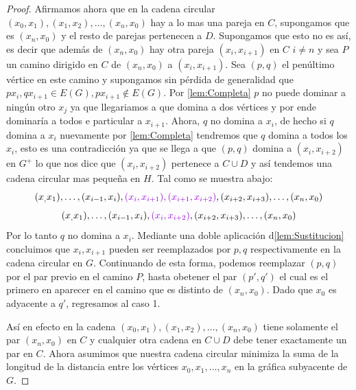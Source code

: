 \begin{proof}
Afirmamos ahora que en la cadena circular $(x_0,x_1),(x_1,x_2),\dots ,
(x_n,x_0)$ hay a lo mas una pareja en $C$, supongamos que es $(x_n,x_0)$ y el
resto de parejas pertenecen a $D$. Supongamos que esto no es así, es decir que
adem\'as de $(x_n,x_0)$ hay otra pareja $(x_i,x_{i+1})$ en $C$ $i\neq n$ y sea
$P$ un camino dirigido en $C$ de $(x_n,x_0)$ a $(x_i,x_{i+1})$. Sea $(p,q)$ el
penúltimo v\'ertice en este camino y supongamos sin p\'erdida de generalidad que
$px_i,qx_{i+1}\in E(G), px_{i+1}\notin E(G)$. Por \cref{lem:Completa} $p$ no
puede dominar a ningún otro $x_j$ ya que llegariamos a que domina a dos
v\'ertices y por ende dominaría a todos e particular a $x_{i+1}$. Ahora, $q$ no
domina a $x_i$, de hecho si $q$ domina a $x_i$ nuevamente por
\cref{lem:Completa} tendremos que $q$ domina a todos los $x_i$, esto es una
contradicci\'on ya que se llega a que $(p,q)$ domina a $(x_i,x_{i+2})$ en $G^+$
lo que nos dice que $(x_i,x_{i+2})$ pertenece a $C\cup D$ y así tendemos una
cadena circular mas pequeña en $H$. Tal como se muestra abajo:
$$ (x_,x_1), \dots , (x_{i-1},x_i ), {\color{malva} (x_i,x_{i+1}),
(x_{i+1},x_{i+2})},(x_{i+2},x_{i+3}), \dots , (x_n,x_0) $$
$$ (x_,x_1), \dots , (x_{i-1},x_i ), {\color{malva}
(x_i,x_{i+2})},(x_{i+2},x_{i+3}), \dots , (x_n,x_0) $$ Por lo tanto $q$ no
domina a $x_i$. Mediante una doble aplicaci\'on d\cref{lem:Sustitucion}
concluimos que $x_i,x_{i+1}$ pueden ser reemplazados por $p,q$ respectivamente
en la cadena circular en $G$. Continuando de esta forma, podemos reemplazar
$(p,q)$ por el par previo en el camino $P$, hasta obetener el par $(p',q')$ el
cual es el primero en aparecer en el camino que es distinto de $(x_n,x_0)$. Dado
que $x_0$ es adyacente a $q'$, regresamos al caso 1.

Así en efecto en la cadena $(x_0,x_1),(x_1,x_2),\dots,(x_n,x_0)$ tiene solamente
el par $(x_n,x_0)$ en $C$ y cualquier otra cadena en $C\cup D$ debe tener
exactamente un par en $C$. Ahora asumimos que nuestra cadena circular minimiza
la suma de la longitud de la distancia entre los vértices $x_0,x_1,\dots ,x_n$
en la gráfica subyacente de $G$.


\end{proof}
